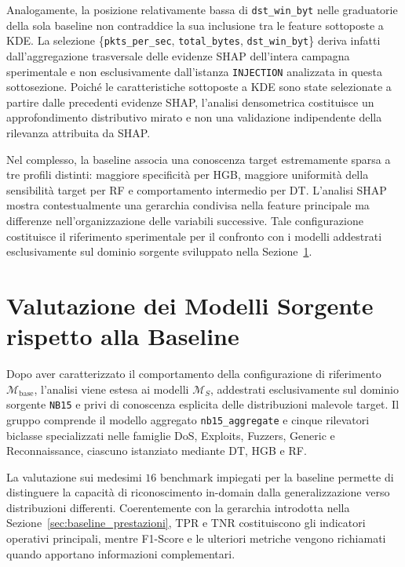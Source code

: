 Analogamente, la posizione relativamente bassa di \texttt{dst\_win\_byt} nelle graduatorie della sola baseline non contraddice la sua inclusione tra le feature sottoposte a KDE. 
La selezione \{\texttt{pkts\_per\_sec}, \texttt{total\_bytes}, \texttt{dst\_win\_byt}\} deriva infatti dall'aggregazione trasversale delle evidenze SHAP dell'intera campagna sperimentale e non esclusivamente dall'istanza \texttt{INJECTION} analizzata in questa sottosezione.
Poiché le caratteristiche sottoposte a KDE sono state selezionate a partire dalle precedenti evidenze SHAP, l'analisi densometrica costituisce un approfondimento distributivo mirato e non una validazione indipendente della rilevanza attribuita da SHAP.

Nel complesso, la baseline associa una conoscenza target estremamente sparsa a tre profili distinti: maggiore specificità per HGB, maggiore uniformità della sensibilità target per RF e comportamento intermedio per DT. 
L'analisi SHAP mostra contestualmente una gerarchia condivisa nella feature principale ma differenze nell'organizzazione delle variabili successive. 
Tale configurazione costituisce il riferimento sperimentale per il confronto con i modelli addestrati esclusivamente sul dominio sorgente sviluppato nella Sezione~\ref{sec:risultati_modelli_sorgente}.




\section{Valutazione dei Modelli Sorgente rispetto alla Baseline}
\label{sec:risultati_modelli_sorgente}

Dopo aver caratterizzato il comportamento della configurazione di riferimento $\mathcal{M}_{\mathrm{base}}$, l'analisi viene estesa ai modelli $\mathcal{M}_{S}$, addestrati esclusivamente sul dominio sorgente \texttt{NB15} e privi di conoscenza esplicita delle distribuzioni malevole target. 
Il gruppo comprende il modello aggregato \texttt{nb15\_aggregate} e cinque rilevatori biclasse specializzati nelle famiglie DoS, Exploits, Fuzzers, Generic e Reconnaissance, ciascuno istanziato mediante DT, HGB e RF.

La valutazione sui medesimi $16$ benchmark impiegati per la baseline permette di distinguere la capacità di riconoscimento in-domain dalla generalizzazione verso distribuzioni differenti. 
Coerentemente con la gerarchia introdotta nella Sezione~\ref{sec:baseline_prestazioni}, TPR e TNR costituiscono gli indicatori operativi principali, mentre F1-Score e le ulteriori metriche vengono richiamati quando apportano informazioni complementari.


